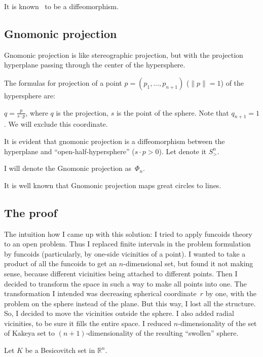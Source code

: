 \documentclass[oneside,draft]{amsart}
\begin{document}
It is known~\cite{stereo} to be a diffeomorphism.

\subsection{Gnomonic projection}

Gnomonic projection is like stereographic projection, but with the projection hyperplane passing through the center of the hypersphere.


The formulas for projection of a point $p=(p_1,\dots,p_{n+1})$ ($\lVert p\rVert = 1$) of the hypersphere are:

$q=\frac{p}{s\cdot p}$, where $q$ is the projection, $s$ is the point of the sphere. Note that $q_{n+1}=1$. We will exclude this coordinate.

It is evident  that gnomonic projection is a diffeomorphism between the hyperplane and ``open-half-hy\-per\-sphe\-re'' ($s\cdot p>0$). Let denote it $S^n_{>}$.

I will denote the Gnomonic projection as~$\Phi_n$.

It is well known that Gnomonic projection maps great circles to lines.

\subsection{The proof}

The intuition how I came up with this solution: I tried to apply funcoids theory to an open problem. Thus I replaced finite intervals in the problem formulation by funcoids (particularly, by one-si\-de vicinities of a point). I wanted to take a product of all the funcoids to get an $n$-di\-men\-si\-on\-al set, but found it not making sense, because different vicinities being attached to different points. Then I decided to transform the space in such a way to make all points into one. The transformation I intended was decreasing spherical coordinate~$r$ by one, with the problem on the sphere instead of the plane. But this way, I lost all the structure. So, I decided to move the vicinities outside the sphere. I also added radial vicinities, to be sure it fills the entire space. I reduced $n$-di\-men\-sio\-na\-li\-ty of the set of Kakeya set to $(n+1)$-di\-men\-sio\-na\-li\-ty of the resulting ``swollen'' sphere.

Let $K$ be a Besicovitch set in $\mathbb{R}^n$.
\end{document}
